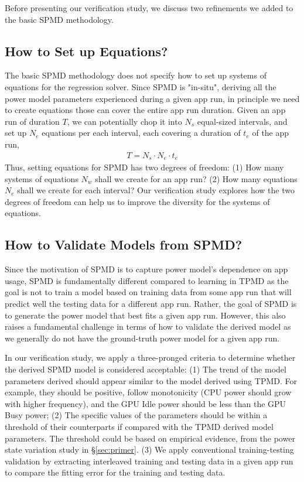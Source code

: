 Before presenting our verification study, we discuss two refinements we added
to the basic SPMD methodology.


\fi





\subsection{How to Set up Equations?}

The basic SPMD methodology does not specify how to set up systems of equations for the regression solver. Since SPMD is "in-situ", \ie deriving all the power model parameters experienced during a given app run,
in principle we need to create equations those can cover the entire app run duration.
Given an app run of duration $T$, 
we can potentially chop it into $N_s$ equal-sized intervals,
and set up $N_e$ equations per each interval, each covering a duration of $t_e$ of the app run, \ie
\begin{eqnarray}
T = N_s \cdot N_e \cdot t_e
\end{eqnarray}
%
Thus, setting equations for SPMD has two degrees of freedom: 
(1) How many systems of equations $N_w$ shall we create for an app run? 
(2) How many equations $N_e$ shall we create for each interval?
Our verification study explores how the two degrees of freedom can 
help us to improve the diversity for the systems of equations. 


\subsection{How to Validate Models from SPMD?}

Since the motivation of SPMD is to capture power model's dependence on app usage, SPMD is fundamentally different compared to learning in TPMD as the goal is not to train a model based on training data from some app run that will predict well the testing data for a different app run. Rather, the goal of SPMD is to generate the power model that best fits a given app run. However, this also raises a fundamental challenge in terms of how to validate the derived model as we generally do not have the ground-truth power model for a given app run. 

{ 
In our verification study, we apply a three-pronged criteria to determine whether the derived SPMD  model is considered acceptable: 
(1) The trend of the model parameters derived should appear similar to the model derived using TPMD. For example, they should be positive, follow monotonicity (\eg CPU power should grow with higher frequency), and the GPU Idle power should be less than the GPU Busy power;
(2) The specific values of the parameters should be within a threshold of their counterparts if compared with the TPMD derived model parameters. The threshold could be based on empirical evidence, \eg from the power state variation study in \S\ref{sec:primer}.
(3) We apply conventional training-testing validation by extracting interleaved training and testing data in a given app run to compare the fitting error for the training and testing data. 
}

